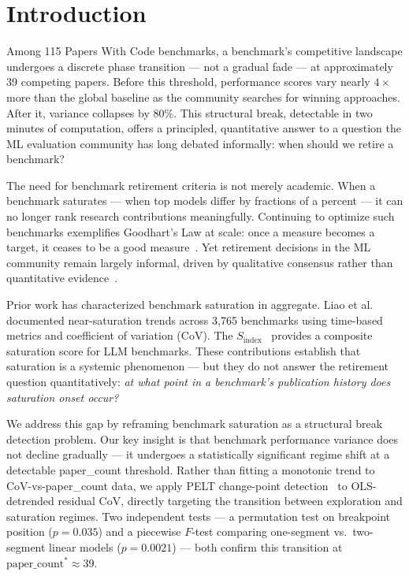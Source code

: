 \section{Introduction}

Among 115 Papers With Code benchmarks, a benchmark's competitive landscape undergoes a discrete phase transition --- not a gradual fade --- at approximately 39 competing papers. Before this threshold, performance scores vary nearly $4\times$ more than the global baseline as the community searches for winning approaches. After it, variance collapses by 80\%. This structural break, detectable in two minutes of computation, offers a principled, quantitative answer to a question the ML evaluation community has long debated informally: when should we retire a benchmark?

The need for benchmark retirement criteria is not merely academic. When a benchmark saturates --- when top models differ by fractions of a percent --- it can no longer rank research contributions meaningfully. Continuing to optimize such benchmarks exemplifies Goodhart's Law at scale: once a measure becomes a target, it ceases to be a good measure~\cite{Goodhart1975}. Yet retirement decisions in the ML community remain largely informal, driven by qualitative consensus rather than quantitative evidence~\cite{Bowman2021}.

Prior work has characterized benchmark saturation in aggregate. Liao et al.~\cite{Liao2022} documented near-saturation trends across 3,765 benchmarks using time-based metrics and coefficient of variation (CoV). The $S_{\text{index}}$~\cite{Akhtar2026} provides a composite saturation score for LLM benchmarks. These contributions establish that saturation is a systemic phenomenon --- but they do not answer the retirement question quantitatively: \textit{at what point in a benchmark's publication history does saturation onset occur?}

We address this gap by reframing benchmark saturation as a structural break detection problem. Our key insight is that benchmark performance variance does not decline gradually --- it undergoes a statistically significant regime shift at a detectable paper\_count threshold. Rather than fitting a monotonic trend to CoV-vs-paper\_count data, we apply PELT change-point detection~\cite{Killick2012} to OLS-detrended residual CoV, directly targeting the transition between exploration and saturation regimes. Two independent tests --- a permutation test on breakpoint position ($p=0.035$) and a piecewise $F$-test comparing one-segment vs.\ two-segment linear models ($p=0.0021$) --- both confirm this transition at $\text{paper\_count}^* \approx 39$.

